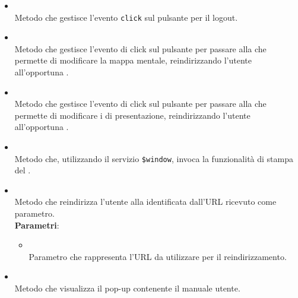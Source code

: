 \begin{itemize}
\begin{itemize}
\begin{itemize}
\\ \dpProjectServiceParam
\item {}
\\ \dpWindowServiceParam
\item {}
\\ \dpAuthenticationServiceParam
\item {}
\\ \dpMindMapServiceParam
\item {}
\\ \dpMDDialogServiceParam
\end{itemize}
\item {}
\\ Metodo che gestisce l'evento \texttt{click} sul pulsante per il logout.
\item {}
\\ Metodo che gestisce l'evento di click sul pulsante per passare alla  che permette di modificare la mappa mentale, reindirizzando l'utente all'opportuna .
\item {}
\\ Metodo che gestisce l'evento di click sul pulsante per passare alla  che permette di modificare i  di presentazione, reindirizzando l'utente all'opportuna .
\item {}
\\ Metodo che, utilizzando il servizio \texttt{\$window}, invoca la funzionalità di stampa del .
\item {}
\\ Metodo che reindirizza l'utente alla  identificata dall'URL ricevuto come parametro.
\\ \textbf{Parametri}:
\begin{itemize}
\item {}
\\ Parametro che rappresenta l'URL da utilizzare per il reindirizzamento.
\end{itemize}
\item {}
\\ Metodo che visualizza il pop-up contenente il manuale utente.

\end{itemize}
\end{itemize}
